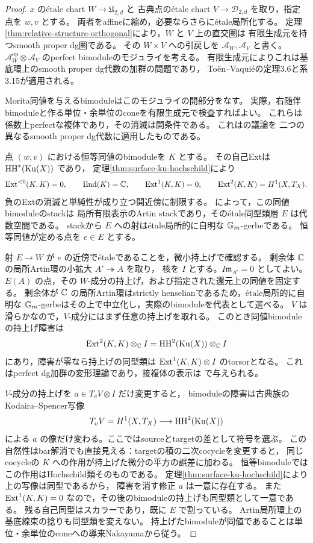 \begin{proof}
$x$ の\'{e}tale chart $W\to\mathfrak U_{2,d}$ と
古典点の\'{e}tale chart $V\to\mathcal D_{2,d}$ を取り，指定点を $w,v$ とする。
両者をaffineに縮め，必要ならさらに\'{e}tale局所化する。
定理\ref{thm:relative-structure-orthogonal}により，$W$ と $V$ 上の直交圏は
有限生成元を持つsmooth proper dg圏である。
その $W\times V$ への引戻しを $\mathcal A_W,\mathcal A_V$ と書く。
$\mathcal A_W^{\mathrm{op}}\otimes\mathcal A_V$ のperfect bimoduleのモジュライを考える。
有限生成元によりこれは基底環上のsmooth proper dg代数の加群の問題であり，
To\"en--Vaqui\'eの定理3.6と系3.15\cite{ToenVaquie2007}が適用される。

Morita同値を与えるbimoduleはこのモジュライの開部分をなす。
実際，右随伴bimoduleと作る単位・余単位のconeを有限生成元で検査すればよい。
これらは係数上perfectな複体であり，その消滅は開条件である。
これは\cite[補題3.25，系3.24の証明]{ToenVaquie2007}の議論を
二つの異なるsmooth proper dg代数に適用したものである。

点 $(w,v)$ における恒等同値のbimoduleを $K$ とする。
その自己Extは $\operatorname{HH}^*(\operatorname{Ku}(X))$ であり，
定理\ref{thm:surface-ku-hochschild}により
\[
 \operatorname{Ext}^{<0}(K,K)=0,\qquad\operatorname{End}(K)=\mathbb C,
 \qquad\operatorname{Ext}^1(K,K)=0,
 \qquad\operatorname{Ext}^2(K,K)=H^1(X,T_X).
\]
負のExtの消滅と単純性が成り立つ開近傍に制限する。
\cite[系3.21--3.22]{ToenVaquie2007}によって，この同値bimoduleのstackは
局所有限表示のArtin stackであり，その\'{e}tale同型類層 $E$ は代数空間である。
stackから $E$ への射は\'{e}tale局所的に自明な $\mathbb G_m$-gerbeである。
恒等同値が定める点を $e\in E$ とする。

射 $E\to W$ が $e$ の近傍で\'{e}taleであることを，微小持上げで確認する。
剰余体 $\mathbb C$ の局所Artin環の小拡大 $A'\twoheadrightarrow A$ を取り，
核を $I$ とする。$I\mathfrak m_{A'}=0$ としてよい。
$E(A)$ の点，その $W$-成分の持上げ，および指定された還元上の同値を固定する。
剰余体が $\mathbb C$ の局所Artin環はstrictly henselianであるため，\'{e}tale局所的に自明な
$\mathbb G_m$-gerbeはその上で中立化し，実際のbimoduleを代表として選べる。
$V$ は滑らかなので，$V$-成分にはまず任意の持上げを取れる。
このとき同値bimoduleの持上げ障害は
\[
 \operatorname{Ext}^2(K,K)\otimes_\mathbb C I
   =\operatorname{HH}^2(\operatorname{Ku}(X))\otimes_\mathbb C I
\]
にあり，障害が零なら持上げの同型類は
$\operatorname{Ext}^1(K,K)\otimes I$ のtorsorとなる。
これはperfect dg加群の変形理論であり，接複体の表示は
\cite[系3.17]{ToenVaquie2007}で与えられる。

$V$-成分の持上げを $a\in T_vV\otimes I$ だけ変更すると，
bimoduleの障害は古典族のKodaira--Spencer写像
\[
 T_vV=H^1(X,T_X)\longrightarrow
       \operatorname{HH}^2(\operatorname{Ku}(X))
\]
による $a$ の像だけ変わる。ここではsourceとtargetの差として符号を選ぶ。
この自然性はbar解消でも直接見える：targetの積の二次cocycleを変更すると，
同じcocycleの $K$ への作用が持上げた微分の平方の誤差に加わる。
恒等bimoduleではこの作用はHochschild類そのものである。
定理\ref{thm:surface-ku-hochschild}により上の写像は同型であるから，
障害を消す修正 $a$ は一意に存在する。
また $\operatorname{Ext}^1(K,K)=0$ なので，その後のbimoduleの持上げも同型類として一意である。
残る自己同型はスカラーであり，既に $E$ で割っている。
Artin局所環上の基底線束の捻りも同型類を変えない。
持上げたbimoduleが同値であることは単位・余単位のconeへの導来Nakayamaから従う。


\end{proof}
